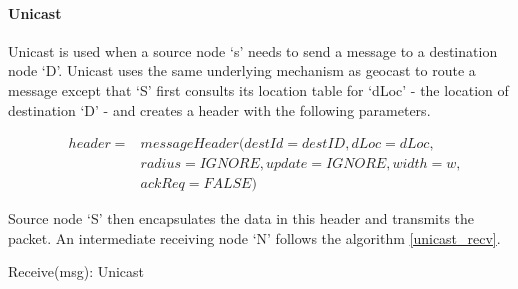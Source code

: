 \paragraph{Unicast}

Unicast is used when a source node `s' needs to send a message to a destination node `D'. Unicast uses the same underlying mechanism as geocast to route a message except that `S' first consults its location table for `dLoc' - the location of destination `D' - and creates a header with the following parameters.

\begin{eqnarray*}
& header = & messageHeader(destId = destID, dLoc = dLoc,\\
&    & radius = IGNORE, update = IGNORE, width = w, \\
& & ackReq = FALSE)
\end{eqnarray*}

Source node `S' then encapsulates the data in this header and transmits the packet.
An intermediate receiving node `N' follows the algorithm \ref{unicast_recv}.

\begin{algorithm}
\caption{Receive(msg): Unicast} 
\label{unicast_recv}
\DontPrintSemicolon
{}
\end{algorithm}
